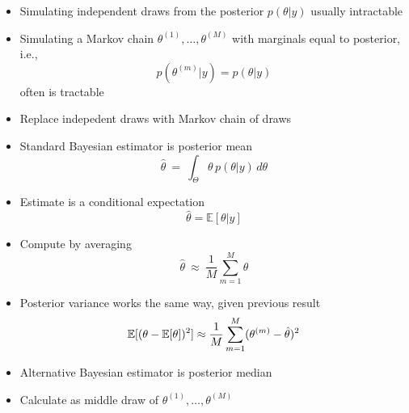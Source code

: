 \documentclass[10pt]{report}
\begin{document}
%
\begin{itemize}
\item Simulating independent draws from the posterior $p(\theta | y)$ usually intractable
\item Simulating a Markov chain $\theta^{(1)}, \ldots, \theta^{(M)}$
  with marginals equal to posterior, i.e.,
\[
p(\theta^{(m)} | y) = p(\theta | y)
\]
often is tractable
\item Replace indepedent draws with Markov chain of draws
\end{itemize}


%
\begin{itemize}
\item Standard Bayesian estimator is posterior mean
\[
\hat{\theta}  \ =  \ \int_{\Theta} \theta \, p(\theta|y) \, d\theta
\]
\item Estimate is a conditional expectation
\[
\hat{\theta} = \mathbb{E}[\theta|y]
\]
\item Compute by averaging
\[
\hat{\theta} \ \approx \ \frac{1}{M} \sum_{m=1}^M \theta
\]
\end{itemize}


%
\begin{itemize}
\item Posterior variance works the same way, given previous result
\[
\mathbb{E}[(\theta - \mathbb{E}[\theta])^2]
\approx \frac{1}{M} \sum_{m=1}^M (\theta^{(m)} - \hat{\theta})^2
\]
\end{itemize}


%
\begin{itemize}
\item Alternative Bayesian estimator is posterior median
\item Calculate as middle draw of $\theta^{(1)}, \ldots,
  \theta^{(M)}$
\end{itemize}
\end{document}
